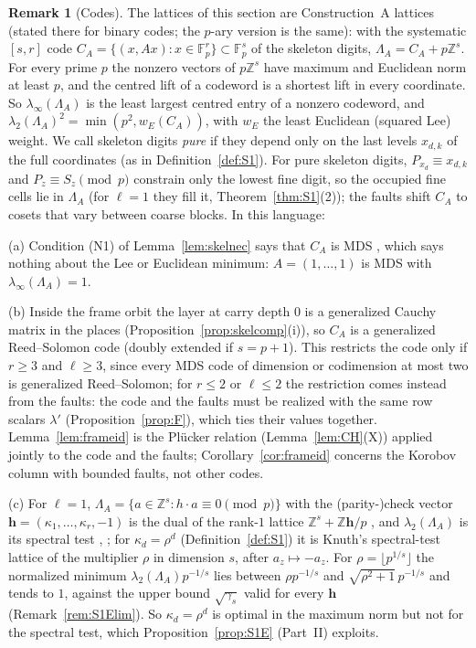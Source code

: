 \documentclass[11pt]{amsart}
\theoremstyle{definition}
\newtheorem{remark}[theorem]{Remark}
\theoremstyle{plain}
\newcommand{\Z}{\mathbb{Z}}
\newcommand{\F}{\mathbb{F}}
\begin{document}
\begin{remark}[Codes]\label{rem:codes}
The lattices of this section are Construction~A lattices \cite[Ch.~5]{CS99} (stated there for binary codes; the $p$-ary version is the same): with the systematic $[s,r]$ code $C_A=\{(x,Ax):x\in\F_p^r\}\subset\F_p^s$ of the skeleton digits, $\Lambda_A=C_A+p\Z^s$. For every prime $p$ the nonzero vectors of $p\Z^s$ have maximum and Euclidean norm at least $p$, and the centred lift of a codeword is a shortest lift in every coordinate. So $\lambda_\infty(\Lambda_A)$ is the least largest centred entry of a nonzero codeword, and $\lambda_2(\Lambda_A)^2=\min(p^2,w_E(C_A))$, with $w_E$ the least Euclidean (squared Lee) weight. We call skeleton digits \emph{pure} if they depend only on the last levels $x_{d,k}$ of the full coordinates (as in Definition~\ref{def:S1}). For pure skeleton digits, $P_{x_d}\equiv x_{d,k}$ and $P_z\equiv S_z\pmod p$ constrain only the lowest fine digit, so the occupied fine cells lie in $\Lambda_A$ (for $\ell=1$ they fill it, Theorem~\ref{thm:S1}(2)); the faults shift $C_A$ to cosets that vary between coarse blocks. In this language:

(a) Condition (N1) of Lemma~\ref{lem:skelnec} says that $C_A$ is MDS \cite[Ch.~11, Thm.~8]{MS77}, which says nothing about the Lee or Euclidean minimum: $A=(1,\dots,1)$ is MDS with $\lambda_\infty(\Lambda_A)=1$.

(b) Inside the frame orbit the layer at carry depth $0$ is a generalized Cauchy matrix in the places (Proposition~\ref{prop:skelcomp}(i)), so $C_A$ is a generalized Reed--Solomon code \cite{RS85} (doubly extended if $s=p+1$). This restricts the code only if $r\ge3$ and $\ell\ge3$, since every MDS code of dimension or codimension at most two is generalized Reed--Solomon; for $r\le2$ or $\ell\le2$ the restriction comes instead from the faults: the code and the faults must be realized with the same row scalars $\lambda'$ (Proposition~\ref{prop:F}), which ties their values together. Lemma~\ref{lem:frameid} is the Pl\"ucker relation (Lemma~\ref{lem:CH}(X)) applied jointly to the code and the faults; Corollary~\ref{cor:frameid} concerns the Korobov column with bounded faults, not other codes.

(c) For $\ell=1$, $\Lambda_A=\{a\in\Z^s:h\cdot a\equiv0\pmod p\}$ with the (parity-)check vector $\mathbf h=(\kappa_1,\dots,\kappa_r,-1)$ is the dual of the rank-$1$ lattice $\Z^s+\Z\mathbf h/p$ \cite{SJ94}, and $\lambda_2(\Lambda_A)$ is its spectral test \cite{CM67}, \cite[Sec.~3.3.4]{Knu97}; for $\kappa_d=\rho^d$ (Definition~\ref{def:S1}) it is Knuth's spectral-test lattice of the multiplier $\rho$ in dimension $s$, after $a_z\mapsto-a_z$. For $\rho=\lfloor p^{1/s}\rfloor$ the normalized minimum $\lambda_2(\Lambda_A)p^{-1/s}$ lies between $\rho p^{-1/s}$ and $\sqrt{\rho^2+1}\,p^{-1/s}$ and tends to $1$, against the upper bound $\sqrt{\gamma_s}$ valid for every $\mathbf h$ (Remark~\ref{rem:S1Elim}). So $\kappa_d=\rho^d$ is optimal in the maximum norm but not for the spectral test, which Proposition~\ref{prop:S1E} (Part~II) exploits.


\end{remark}
\end{document}
